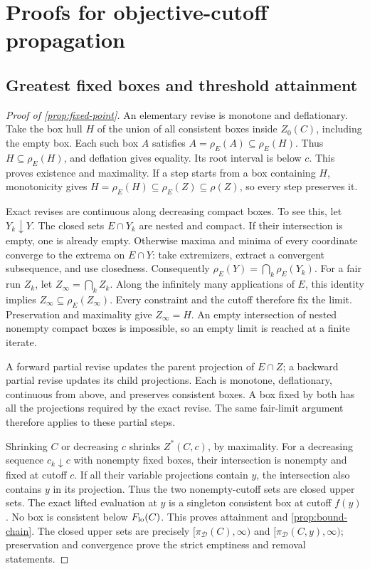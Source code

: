 \section{Proofs for objective-cutoff propagation}
\label{app:propagation}

\subsection{Greatest fixed boxes and threshold attainment}
\label{app:propagation-fixed-point}

\begin{proof}[Proof of \cref{prop:fixed-point}]
An elementary revise is monotone and deflationary. Take the box hull $H$
of the union of all consistent boxes inside $Z_0(C)$, including the empty
box. Each such box $A$ satisfies
$A=\rho_E(A)\subseteq\rho_E(H)$. Thus $H\subseteq\rho_E(H)$, and
deflation gives equality. Its root interval is below $c$. This proves
existence and maximality. If a step starts from a box containing $H$,
monotonicity gives
$H=\rho_E(H)\subseteq\rho_E(Z)\subseteq\rho(Z)$, so every step preserves it.

Exact revises are continuous along decreasing compact boxes. To see this,
let $Y_k\downarrow Y$. The closed sets $E\cap Y_k$ are nested and compact.
If their intersection is empty, one is already empty. Otherwise maxima
and minima of every coordinate converge to the extrema on $E\cap Y$:
take extremizers, extract a convergent subsequence, and use closedness.
Consequently $\rho_E(Y)=\bigcap_k\rho_E(Y_k)$.
For a fair run $Z_k$, let $Z_\infty=\bigcap_kZ_k$. Along the infinitely
many applications of $E$, this identity implies
$Z_\infty\subseteq\rho_E(Z_\infty)$. Every constraint and the cutoff
therefore fix the limit. Preservation and maximality give $Z_\infty=H$.
An empty intersection of nested nonempty compact boxes is impossible,
so an empty limit is reached at a finite iterate.

A forward partial revise updates the parent projection of $E\cap Z$;
a backward partial revise updates its child projections. Each is monotone,
deflationary, continuous from above, and preserves consistent boxes.
A box fixed by both has all the projections required by the exact revise.
The same fair-limit argument therefore applies to these partial steps.

Shrinking $C$ or decreasing $c$ shrinks $Z^*(C,c)$, by maximality.
For a decreasing sequence $c_k\downarrow c$ with nonempty fixed boxes,
their intersection is nonempty and fixed at cutoff $c$. If all their
variable projections contain $y$, the intersection also contains $y$ in
its projection. Thus the two nonempty-cutoff sets are closed upper sets.
The exact lifted evaluation at $y$ is a singleton consistent box at
cutoff $f(y)$. No box is consistent below $F_{\rm lo}(C)$. This proves
attainment and \eqref{prop:bound-chain}. The closed upper sets are precisely
$[\pi_{\mathcal D}(C),\infty)$ and
$[\pi_{\mathcal D}(C,y),\infty)$; preservation and convergence prove the
strict emptiness and removal statements.
\end{proof}

